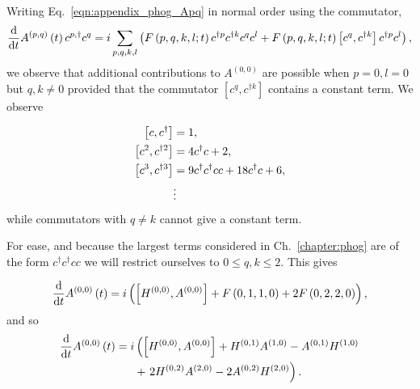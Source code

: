 Writing Eq.~\ref{eqn:appendix_phog_Apq} in normal order using the commutator,
\begin{equation}
\frac{\mathrm{d}}{\mathrm{d}t} A^{\left(p, q\right)}\left(t\right) c^{p, \dagger} c^q = i \sum_{p, q, k, l}\left( F\left( p, q, k, l;t\right) c^{\dagger p} c^{\dagger k} c^q c^l + F\left(p, q, k, l;t\right)  \left[ c^{q}, c^{\dagger k}\right] c^{\dagger p} c^l \right),
\end{equation}
we observe that additional contributions to $A^{\left(0, 0\right)}$ are possible when $p=0, l=0$ but $q, k \ne 0$ provided that the commutator $\left[ c^q, c^{\dagger k}\right]$ contains a constant term. We observe

\begin{align}\label{eqn:phog_appendix_commutator}
\left[ c, c^\dagger \right] &= 1, \notag \\
%
\left[ c^2, c^{\dagger 2} \right] &= 4 c^\dagger c + 2, \notag \\
%
\left[ c^3, c^{\dagger 3} \right] &= 9 c^\dagger c^\dagger c c + 18 c^\dagger c + 6 ,\notag \\
%
&\vdots
\end{align}
while commutators with $q \ne k$ cannot give a constant term. 

For ease, and because the largest terms considered in Ch.~\ref{chapter:phog} are of the form $c^\dagger c^\dagger c c$ we will restrict ourselves to $0 \le q, k \le 2$. This gives

\begin{equation}
\frac{\mathrm{d}}{\mathrm{d}t} A^{\left(0, 0\right)}\left(t\right) = i \left( \left[ H^{\left(0, 0\right)}, A^{\left(0, 0\right)}\right] + F\left(0, 1, 1, 0\right) + 2 F\left(0, 2, 2, 0\right)\right), \notag
\end{equation}
and so 
\begin{align}\label{eqn:ddt_a00}
\ddt A^{\left(0, 0\right)}\left(t\right) = i  &\left(\left[ H^{\left(0, 0\right)}, A^{\left(0, 0\right)}\right] + H^{\left(0, 1\right)} A^{\left(1, 0\right)} - A^{\left(0, 1\right)} H^{\left(1, 0\right)} \right. \notag \\
%
&+\left. 2 H^{\left(0, 2\right)} A^{\left(2, 0\right)} - 2 A^{\left(0, 2\right)} H^{\left(2, 0\right)} \right).
\end{align}

